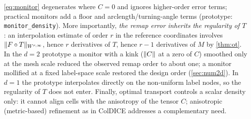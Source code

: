 \begin{remark}\label{rem:monreg}
\eqref{eq:monitor} degenerates where $C=0$ and ignores higher-order error terms; practical monitors add a floor and
arclength/turning-angle terms (prototype: \texttt{monitor\_density}). More importantly, \emph{the remap error
inherits the regularity of $T$}: an interpolation estimate of order $r$ in the reference coordinates involves
$\lVert F\circ T\rVert_{W^{r,\infty}}$, hence $r$ derivatives of $T$, hence $r-1$ derivatives of $M$ by \cref{thm:ot}. In
the $d=2$ prototype a monitor with a kink ($\lVert C\rVert$ at a zero of $C$) smoothed only at the mesh scale reduced
the observed remap order to about one; a monitor mollified at a fixed label-space scale restored the design
order (\cref{sec:num2d}). In $d=1$ the prototype interpolates directly on the non-uniform label nodes, so the
regularity of $T$ does not enter. Finally, optimal transport controls a scalar density only: it cannot align cells
with the anisotropy of the tensor $C$; anisotropic (metric-based) refinement as in ColDICE addresses a complementary need.
\end{remark}
